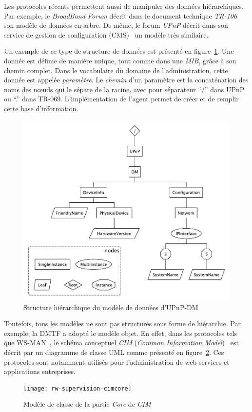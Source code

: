 Les protocoles récents permettent aussi de manipuler des données hiérarchiques. Par exemple, le \textit{BroadBand Forum} décrit dans le document technique \textit{TR-106}~\cite{BBF:tr106} son modèle de données en arbre. De même, le forum \textit{UPnP} décrit dans son service de gestion de configuration (CMS)~\cite{UPnP:DMCMS} un modèle très similaire.

Un exemple de ce type de structure de données est présenté en figure~\ref{fig:rw:supervision:dmtree}. Une donnée est définie de manière unique, tout comme dans une \textit{MIB}, grâce à son chemin complet. Dans le vocabulaire du domaine de l'administration, cette donnée est appelée \textit{paramètre}. Le \textit{chemin} d'un paramètre est la concaténation des noms des nœuds qui le sépare de la racine, avec pour séparateur \enquote{/} dans UPnP ou \enquote{.} dans TR-069. L'implémentation de l'agent permet de créer et de remplir cette base d'information.

\begin{figure}[ht]
    \centering
    \includegraphics[width=.5\textwidth]{fig/rw-supervision-dmtree}
    \caption{Structure hiérarchique du modèle de données d'UPnP-DM}\label{fig:rw:supervision:dmtree}
\end{figure}

Toutefois, tous les modèles ne sont pas structurés sous forme de hiérarchie. Par exemple, la DMTF a adopté le modèle objet. En effet, dans les protocoles tels que WS-MAN~\cite{DMTF:WS-MAN}, le schéma conceptuel \textit{CIM} (\textit{Common Information Model})~\cite{DMTF:CIM} est décrit par un diagramme de classe UML comme présenté en figure~\ref{fig:rw:supervision:cimcore}. Ces protocoles sont notamment utilisés pour l'administration de web-services et applications entreprises. 

\begin{figure}[ht]
    \centering
    \texttt{[image: rw-supervision-cimcore]}
    \caption{Modèle de classe de la partie \textit{Core} de \textit{CIM}}\label{fig:rw:supervision:cimcore}
\end{figure}

